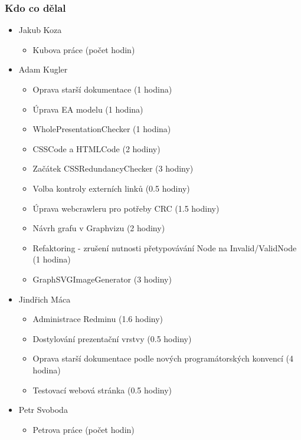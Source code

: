 \documentclass{beamer}
\begin{document}
\begin{frame}[allowframebreaks]\frametitle{Kdo co dělal} 
  \begin{itemize}
    \item Jakub Koza
      \begin{itemize}
       \item Kubova práce (počet hodin)
     \end{itemize}

    \item Adam Kugler
      \begin{itemize}
       \item Oprava starší dokumentace (1 hodina)
			 \item Úprava EA modelu (1 hodina)
       \item WholePresentationChecker (1 hodina)
			 \item CSSCode a HTMLCode (2 hodiny)
       \item Začátek CSSRedundancyChecker (3 hodiny)
       \item Volba kontroly externích linků (0.5 hodiny)
			 \item Úprava webcrawleru pro potřeby CRC (1.5 hodiny)
			 \item Návrh grafu v Graphvizu (2 hodiny)
       \item Refaktoring - zrušení nutnosti přetypovávání Node na Invalid/ValidNode (1 hodina)
			 \item GraphSVGImageGenerator (3 hodiny)
     \end{itemize}

    \item Jindřich Máca
      \begin{itemize}
       \item Administrace Redminu (1.6 hodiny)
			 \item Dostylování prezentační vrstvy (0.5 hodiny)
			 \item Oprava starší dokumentace podle nových programátorských konvencí (4 hodina)
			 \item Testovací webová stránka (0.5 hodiny)
     \end{itemize}

    \item Petr Svoboda
      \begin{itemize}
       \item Petrova práce (počet hodin)
     \end{itemize}
   \end{itemize}  
\end{frame} 
\end{document}
